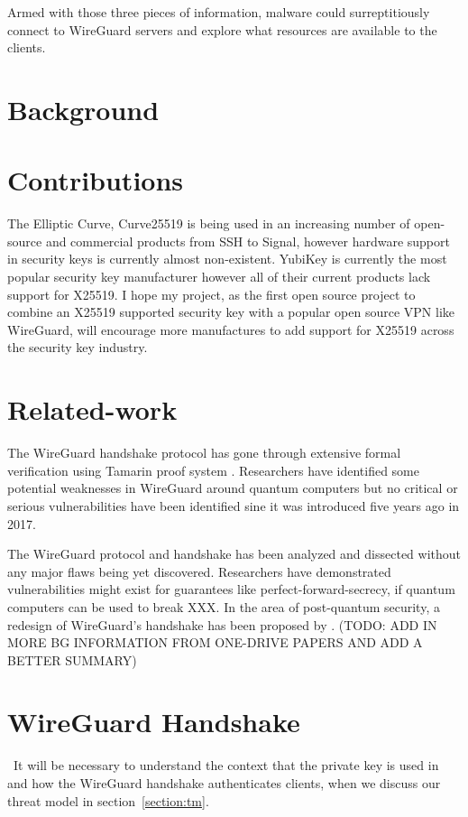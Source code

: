 \documentclass [11pt, proquest] {uwthesis}[2020/02/24]
\begin{document}
Armed with those three pieces of information, malware could surreptitiously connect to WireGuard servers and explore what resources are available to the clients.

\section {Background}


\section {Contributions}
The Elliptic Curve, Curve25519 is being used in an increasing number of open-source and commercial products\cite{noauthor_things_nodate-1} from SSH to Signal, however hardware support in 
security keys is currently almost non-existent. YubiKey is currently the most popular security key manufacturer however all of their current products 
lack support for X25519. I hope my project, as the first open source project to combine an X25519 supported security key with a popular open source VPN like WireGuard, will encourage more manufactures to add support for X25519 across the security key industry.

\section {Related-work}
The WireGuard handshake protocol has gone through extensive formal verification using Tamarin proof system \cite{donenfeld_formal_2018}. Researchers have identified some potential weaknesses in WireGuard around quantum computers but no critical or serious vulnerabilities have been identified sine it was introduced five years ago in 2017.

The WireGuard protocol and handshake has been analyzed and dissected without any major flaws being yet discovered. Researchers have demonstrated vulnerabilities might exist for guarantees like perfect-forward-secrecy, if quantum computers can be used to break XXX.  In the area of post-quantum security, a redesign of WireGuard's handshake has been proposed by \cite{hulsing_post-quantum_2021}.
(TODO: ADD IN MORE BG INFORMATION FROM ONE-DRIVE PAPERS AND ADD A BETTER SUMMARY)

\section {WireGuard Handshake}
\ It will be necessary to understand the context that the private key is used in and how the WireGuard handshake authenticates clients, when we discuss our threat model in section~\ref{section:tm}. 
\end{document}
